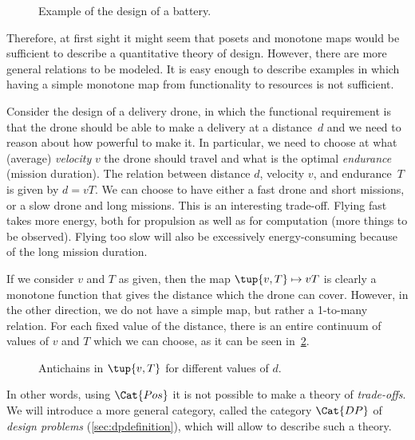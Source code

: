 \begin{figure}[h!]
    \centering
    \caption{Example of the design of a battery. \label{fig:battery-example}}
\end{figure}

Therefore, at first sight it might seem that posets and monotone maps
would be sufficient to describe a quantitative theory of design.
However, there are more general relations to be modeled. It is easy enough
to describe examples in which having a simple monotone map from functionality
to resources is not sufficient.

\begin{example}
Consider the design of a delivery drone, in which the functional
requirement is that the drone should be able to make a delivery
at a distance~$d$ and we need to reason about how powerful to make
it. In particular, we need to choose at what (average) \emph{velocity} $v$ the drone  should travel and what is the optimal \emph{endurance} (mission duration). The relation between distance $d$, velocity $v$, and endurance~$T$ is given by $d=vT$. We can choose to have either a fast drone and short missions, or a slow drone and long missions. This is an interesting trade-off. Flying fast takes more energy, both for propulsion as well as for computation (more things to be observed). Flying too slow will also be excessively energy-consuming because of the long mission duration.

If we consider $v$ and $T$ as given, then the map $\tup{v,T} \mapsto vT$ is clearly a monotone function that gives the distance which the drone can cover. However, in the other direction, we do not have a simple map, but rather a 1-to-many relation. For each fixed value of the distance, there is an entire continuum of values of $v$ and $T$ which we can choose, as it can be seen in~\cref{fig:drone-example-antichain}.

\begin{figure}[h!]
    \centering
    \caption{Antichains in $\tup{v,T}$ for different values of $d$. \label{fig:drone-example}
    \label{fig:drone-example-antichain}}
\end{figure}

\end{example}

In other words, using $\Cat{Pos}$ it is not possible to make a theory of \emph{trade-offs}. We will introduce a more general category, called  the category $\Cat{DP}$ of
\emph{design problems} (\cref{sec:dpdefinition}), which will allow to describe such a theory.
    

